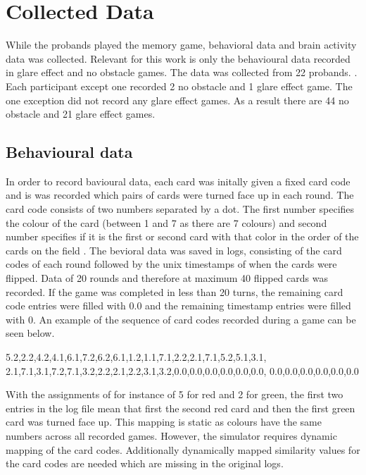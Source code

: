 \chapter{Collected Data}
While the probands played the memory game, behavioral data and brain activity data was collected. Relevant for this work is only the behavioural data recorded in glare effect and no obstacle games. The data was collected from 22 probands. . Each participant except one recorded 2 no obstacle and 1 glare effect game. The one exception did not record any glare effect games. As a result there are 44 no obstacle and 21 glare effect games.

\section{Behavioural data}
In order to record bavioural data, each card was initally given a fixed card code and is was recorded which pairs of cards were turned face up in each round. The card code consists of two numbers separated by a dot. The first number specifies the colour of the card (between 1 and 7 as there are 7 colours) and second number specifies if it is the first or second card with that color in the order of the cards on the field . The bevioral data was saved in logs, consisting of the card codes of each round followed by the unix timestamps of when the cards were flipped. Data of 20 rounds and therefore at maximum 40 flipped cards was recorded. If the game was completed in less than 20 turns, the remaining card code entries were filled with 0.0 and the remaining timestamp entries were filled with 0. An example of the sequence of card codes recorded during a game can be seen below.
\begin{verbatim*}
5.2,2.2,4.2,4.1,6.1,7.2,6.2,6.1,1.2,1.1,7.1,2.2,2.1,7.1,5.2,5.1,3.1,
2.1,7.1,3.1,7.2,7.1,3.2,2.2,2.1,2.2,3.1,3.2,0.0,0.0,0.0,0.0,0.0,0.0,
0.0,0.0,0.0,0.0,0.0,0.0
\end{verbatim*}

 With the assignments of for instance of 5 for red and 2 for green, the first two entries in the log file mean that first the second red card and then the first green card was turned face up. This mapping is static as colours have the same numbers across all recorded games. However, the simulator requires dynamic mapping of the card codes. Additionally dynamically mapped similarity values for the card codes are needed which are missing in the original logs.


